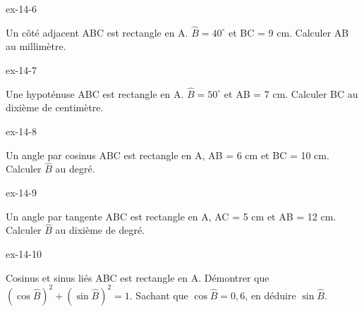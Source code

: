 \clearpage{}
\begin{blocLivre}{ex-14-6}\begin{exercice}[2]{Un côté adjacent}
ABC est rectangle en A. $\widehat B=40^\circ$ et BC = 9 cm. Calculer AB au millimètre.
\label{fig-ex-14-6}
\end{exercice}\end{blocLivre}
\begin{blocLivre}{ex-14-7}\begin{exercice}[2]{Une hypoténuse}
ABC est rectangle en A. $\widehat B=50^\circ$ et AB = 7 cm. Calculer BC au dixième de centimètre.
\label{fig-ex-14-7}
\end{exercice}\end{blocLivre}
\begin{blocLivre}{ex-14-8}\begin{exercice}[2]{Un angle par cosinus}
ABC est rectangle en A, AB = 6 cm et BC = 10 cm. Calculer $\widehat B$ au degré.
\label{fig-ex-14-8}
\end{exercice}\end{blocLivre}
\begin{blocLivre}{ex-14-9}\begin{exercice}[2]{Un angle par tangente}
ABC est rectangle en A, AC = 5 cm et AB = 12 cm. Calculer $\widehat B$ au dixième de degré.
\label{fig-ex-14-9}
\end{exercice}\end{blocLivre}
\begin{blocLivre}{ex-14-10}\begin{exercice}[2]{Cosinus et sinus liés}
ABC est rectangle en A. Démontrer que $(\cos\widehat B)^2+(\sin\widehat B)^2=1$. Sachant que $\cos\widehat B=0{,}6$, en déduire $\sin\widehat B$.
\label{fig-ex-14-10}
\end{exercice}\end{blocLivre}

